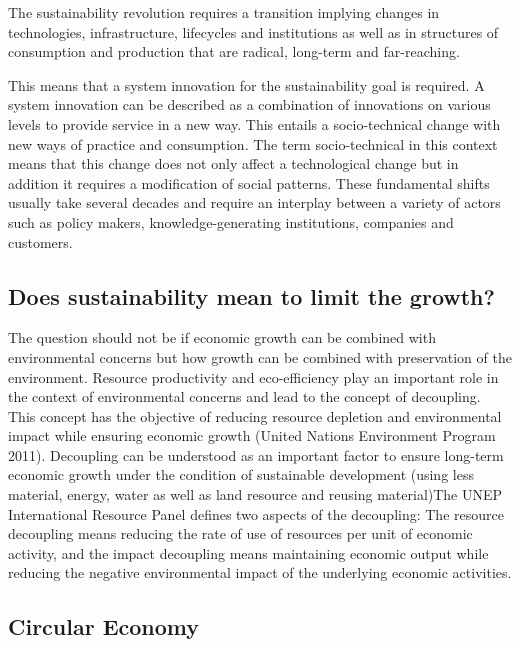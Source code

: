 The sustainability revolution requires a transition implying changes in technologies,
infrastructure, lifecycles and institutions as well as in structures of consumption and production
that are radical, long-term and far-reaching.

This means that a system innovation for the sustainability goal is required.
A system innovation can be described as a combination of innovations on various levels to
provide service in a new way.
This entails a socio-technical change with new ways of practice and consumption. The term
socio-technical in this context means that this change does not only affect a technological
change but in addition it requires a modification of social patterns. These fundamental shifts
usually take several decades and require an interplay between a variety of actors such as
policy makers, knowledge-generating institutions, companies and customers.

\subsection{Does sustainability mean to limit the growth?}
The question should not be if economic growth can be combined with environmental concerns but
how growth can be combined with preservation of the environment.
Resource productivity and eco-efficiency play an important role in the context of environmental
concerns and lead to the concept of decoupling.
This concept has the objective of reducing resource depletion and environmental impact while
ensuring economic growth (United Nations Environment Program 2011).
Decoupling can be understood as an important factor to ensure long-term economic growth
under the condition of sustainable development (using less material, energy, water as well as
land resource and reusing material)The UNEP International Resource Panel defines two aspects of the decoupling:
The resource decoupling means reducing the rate of use of resources per unit of
economic activity, and the impact decoupling means maintaining economic output while
reducing the negative environmental impact of the underlying economic activities.

\subsection{Circular Economy }

